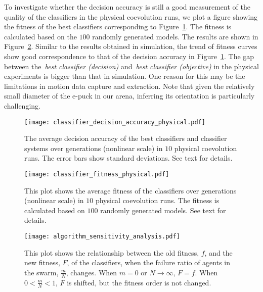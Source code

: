 To investigate whether the decision accuracy is still a good measurement of the quality of the classifiers in the physical coevolution runs, we plot a figure showing the fitness of the best classifiers corresponding to Figure~\ref{fig:classifier_decision_accuracy_physical}. The fitness is calculated based on the $100$ randomly generated models. The results are shown in Figure~\ref{fig:classifier_fitness_physical}. Similar to the results obtained in simulation, the trend of fitness curves show good correspondence to that of the decision accuracy in Figure~\ref{fig:classifier_decision_accuracy_physical}. The gap between the~\textit{best classifier (decision)} and~\textit{best classifier (objective)} in the physical experiments is bigger than that in simulation. One reason for this may be the limitations in motion data capture and extraction. Note that given the relatively small diameter of the e-puck in our arena, inferring its orientation is particularly challenging.

\begin{figure}[!t]
\centering
\texttt{[image: classifier\_decision\_accuracy\_physical.pdf]}
\caption{The average decision accuracy of the best classifiers and classifier systems over generations (nonlinear scale) in $10$ physical coevolution runs. The error bars show standard deviations. See text for details.}
\label{fig:classifier_decision_accuracy_physical}
\end{figure}

\begin{figure}[!t]
	\centering
	\texttt{[image: classifier\_fitness\_physical.pdf]}
	\caption{This plot shows the average fitness of the classifiers over generations (nonlinear scale) in $10$ physical coevolution runs. The fitness is calculated based on $100$ randomly generated models. See text for details.}
	\label{fig:classifier_fitness_physical}
\end{figure}

\begin{figure}[!t]
    \centering
    \texttt{[image: algorithm\_sensitivity\_analysis.pdf]}
    \caption{This plot shows the relationship between the old fitness, $f$, and the new fitness, $F$, of the classifiers, when the failure ratio of agents in the swarm, $\frac{m}{N}$, changes. When $m = 0$ or $N \rightarrow \infty$, $F=f$. When $0 < \frac{m}{N} < 1$, $F$ is shifted, but the fitness order is not changed.}
    \label{fig:analysis_algorithm}
\end{figure}

